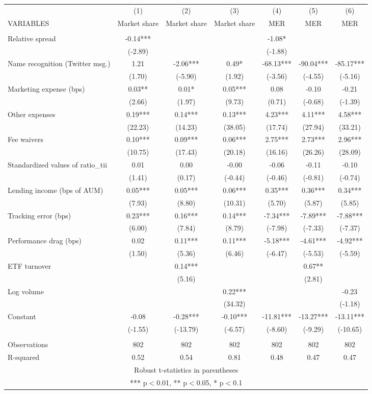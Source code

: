 \documentclass[]{article}
\begin{document}
\begin{tabular}{lcccccc} \hline
 & (1) & (2) & (3) & (4) & (5) & (6) \\
VARIABLES & Market share & Market share & Market share & MER & MER & MER \\ \hline
 &  &  &  &  &  &  \\
Relative spread & -0.14*** &  &  & -1.08* &  &  \\
 & (-2.89) &  &  & (-1.88) &  &  \\
Name recognition (Twitter msg.) & 1.21 & -2.06*** & 0.49* & -68.13*** & -90.04*** & -85.17*** \\
 & (1.70) & (-5.90) & (1.92) & (-3.56) & (-4.55) & (-5.16) \\
Marketing expense (bps) & 0.03** & 0.01* & 0.05*** & 0.08 & -0.10 & -0.21 \\
 & (2.66) & (1.97) & (9.73) & (0.71) & (-0.68) & (-1.39) \\
Other expenses & 0.19*** & 0.14*** & 0.13*** & 4.23*** & 4.11*** & 4.58*** \\
 & (22.23) & (14.23) & (38.05) & (17.74) & (27.94) & (33.21) \\
Fee waivers & 0.10*** & 0.09*** & 0.06*** & 2.75*** & 2.73*** & 2.96*** \\
 & (10.75) & (17.43) & (20.18) & (16.16) & (26.26) & (28.09) \\
Standardized values of ratio\_tii & 0.01 & 0.00 & -0.00 & -0.06 & -0.11 & -0.10 \\
 & (1.41) & (0.17) & (-0.44) & (-0.46) & (-0.81) & (-0.74) \\
Lending income (bps of AUM) & 0.05*** & 0.05*** & 0.06*** & 0.35*** & 0.36*** & 0.34*** \\
 & (7.93) & (8.80) & (10.31) & (5.70) & (5.87) & (5.85) \\
Tracking error (bps) & 0.23*** & 0.16*** & 0.14*** & -7.34*** & -7.89*** & -7.88*** \\
 & (6.00) & (7.84) & (8.79) & (-7.98) & (-7.33) & (-7.37) \\
Performance drag (bps) & 0.02 & 0.11*** & 0.11*** & -5.18*** & -4.61*** & -4.92*** \\
 & (1.50) & (5.36) & (6.46) & (-6.47) & (-5.53) & (-5.59) \\
ETF turnover &  & 0.14*** &  &  & 0.67** &  \\
 &  & (5.16) &  &  & (2.81) &  \\
Log volume &  &  & 0.22*** &  &  & -0.23 \\
 &  &  & (34.32) &  &  & (-1.18) \\
Constant & -0.08 & -0.28*** & -0.10*** & -11.81*** & -13.27*** & -13.11*** \\
 & (-1.55) & (-13.79) & (-6.57) & (-8.60) & (-9.29) & (-10.65) \\
 &  &  &  &  &  &  \\
Observations & 802 & 802 & 802 & 802 & 802 & 802 \\
 R-squared & 0.52 & 0.54 & 0.81 & 0.48 & 0.47 & 0.47 \\ \hline
\multicolumn{7}{c}{ Robust t-statistics in parentheses} \\
\multicolumn{7}{c}{ *** p$<$0.01, ** p$<$0.05, * p$<$0.1} \\
\end{tabular}
\end{document}
